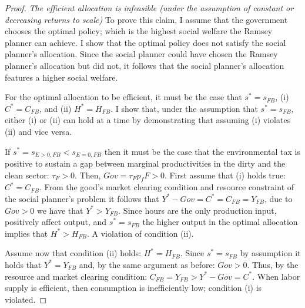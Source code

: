 \begin{proof}\textit{The efficient allocation is infeasible (under the assumption of constant or decreasing returns to scale)}
	To prove this claim, I assume that the government chooses the optimal policy; which is the highest social welfare the Ramsey planner can achieve. I show that the optimal policy does not satisfy the social planner's allocation. Since the social planner could have chosen the Ramsey planner's allocation  but did not, it follows that the social planner's allocation features a higher social welfare.
	
	For the optimal allocation to be efficient, it must be the case that $s^*=s_{FB}$, (i) $C^*=C_{FB}$, and (ii) $H^*=H_{FB}$. I show that, under the assumption that $s^*=s_{FB}$, either (i) or (ii) can hold at a time by demonstrating that assuming (i) violates (ii) and vice versa.
	
	
	
	
	If $s^*=s_{E>0,FB}<s_{E=0,FB}$ then it must be the case that the environmental tax is positive to sustain a gap between marginal productivities in the dirty and the clean sector: $\tau_F>0$. Then, $Gov=\tau_Fp_fF>0$. 
	First assume that (i) holds true: $C^*=C_{FB}$. From the good's market clearing condition and resource constraint of the social planner's problem it follows that
	$Y^*-Gov=C^*=C_{FB}=Y_{FB}$, due to  $Gov>0$ we have that $Y^*>Y_{FB}$. Since hours are the only production input, positively affect output, and $s^*=s_{FB}$ the higher output in the optimal allocation implies that $H^*>H_{FB}$. A violation of condition (ii). 
	
	Assume now that condition (ii) holds: $H^*=H_{FB}$. Since $s^*=s_{FB}$ by assumption it holds that $Y^*=Y_{FB}$ and, by the same argument as before: $Gov>0$. Thus, by the resource and market clearing condition: $C_{FB}=Y_{FB}>Y^*-Gov=C^*$. When labor supply is efficient, then consumption is inefficiently low; condition (i) is violated. 
	

\end{proof}
